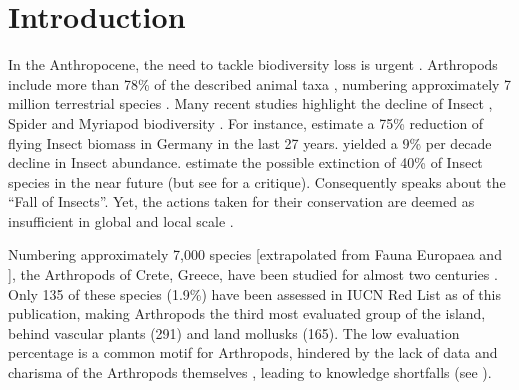 \section{Introduction}
\label{sec:arthropods-intro}

In the Anthropocene, the need to tackle biodiversity loss is urgent \parencite{johnson2017biodiversity, meng2021biodiversity}.
Arthropods include more than 78\% of the described animal taxa \parencite{zhang2013animal},
numbering approximately 7 million terrestrial species \parencite{stork2018how-many}. Many recent
studies highlight the decline of Insect \parencite{cardoso2020scientists, wagner2020insect, raven2021agricultural},
Spider \parencite{potapov2020functional, branco2020an-expert-based} and Myriapod biodiversity \parencite{karam-gemael2018why-be-red-listed, iniesta2023where}.
For instance, \textcite{hallmann2017more} estimate a 75\% reduction of flying Insect
biomass in Germany in the last 27 years. \textcite{klink2020meta-analysis} yielded a 9\% per
decade decline in Insect abundance. \textcite{sanchez-bayo2019worldwide} estimate
the possible extinction of 40\% of Insect species in the near future (but see
\textcite{wagner2019global} for a critique). Consequently \textcite{samways2019insect} speaks about the “Fall of Insects”.
Yet, the actions taken for their conservation are deemed as insufficient in
global and local scale \parencite{cardoso2012the-underrepresentation, damen2013protected, chowdhury2023three-quarters}.

Numbering approximately 7,000 species [extrapolated from Fauna Europaea
\parencite{jong2014fauna} and \textcite{legakis2018}], the Arthropods of Crete, Greece,
have been studied for almost two centuries \parencite{Anastasiou2018Tenebrionid}.
Only 135 of these species (1.9\%) have been assessed in IUCN Red List as of
this publication, making Arthropods the third most evaluated group of the
island, behind vascular plants (291) and land mollusks (165). The low
evaluation percentage is a common motif for Arthropods, hindered by the lack of
data \parencite{cardoso2011adapting, cardoso2011the-seven, wagner2021insect, cardoso2012the-underrepresentation} and
charisma of the Arthropods themselves \parencite{cardoso2012habitats, wang2021out-of-sight}, leading
to knowledge shortfalls (see \textcite{hortal2015seven}).

